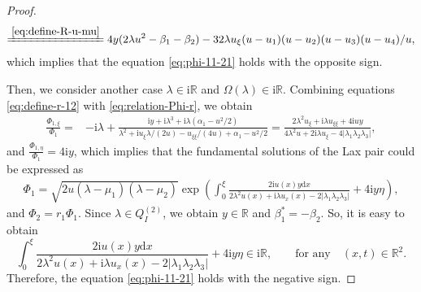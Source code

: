 \documentclass[11pt,reqno]{amsart}
\newcommand{\ii}{\mathrm{i}}
\newcommand{\dd}{\mathrm{d}}
\numberwithin{equation}{section}
\begin{document}
\begin{proof}
\begin{equation}
\begin{split}
			\xlongequal{\eqref{eq:define-R-u-mu}} 4y(2\lambda u^2-\beta_1-\beta_2)-32\lambda u_{\xi}(u-u_1)(u-u_2)(u-u_3)(u-u_4)/u,
		\end{split}
	\end{equation}
  which implies that the equation \eqref{eq:phi-11-21} holds with the opposite sign.
  
	
	Then, we consider another case $\lambda \in  \ii \mathbb{R}$ and $\Omega(\lambda)\in \ii \mathbb{R}$.
	Combining equations \eqref{eq:define-r-12} with \eqref{eq:relation-Phi-r}, we obtain 
	\begin{equation}\nonumber
		\begin{split}
			\frac{\Phi_{1,\xi}}{\Phi_{1}}
			=&-\ii \lambda+\frac{\ii y +\ii \lambda^3+\ii \lambda(\alpha_1-u^2/2)}{\lambda^2+\ii u_{\xi}\lambda/(2u)-u_{\xi\xi}/(4u)+\alpha_1-u^2/2} 
			=\frac{2\lambda^2 u_{\xi}+\ii \lambda u_{\xi\xi}+4\ii uy }{4\lambda^2u+2\ii\lambda u_{\xi}-4|\lambda_1\lambda_2\lambda_3|}, 
		\end{split}
	\end{equation}
	and $\frac{\Phi_{1,\eta}}{\Phi_{1}}=4\ii y$,	 which implies that the fundamental solutions of the Lax pair could be expressed as
	\begin{equation}\nonumber
		\begin{split}
			\Phi_{1}
			=\sqrt{2 u(\lambda-\mu_1)(\lambda-\mu_2)}\exp\left(\int_{0}^{\xi}\frac{2\ii u(x)y \dd x}{2\lambda^2u(x)+\ii\lambda u_x(x)-2|\lambda_1\lambda_2\lambda_3|}+4\ii y \eta\right), 
		\end{split}
	\end{equation}
	and $\Phi_{2}=r_1\Phi_{1}$.
	Since $\lambda\in  Q^{(2)} _I$, we obtain $y\in \mathbb{R}$ and $\beta_1^*=-\beta_2$.
	So, it is easy to obtain 
	\begin{equation}\nonumber
		\int_{0}^{\xi}\frac{2\ii u(x)y \dd x}{2\lambda^2u(x)+\ii\lambda u_x(x)-2|\lambda_1\lambda_2\lambda_3|}+4\ii y \eta\in \ii \mathbb{R}, \qquad \text{for any} \quad (x,t)\in \mathbb{R}^2. 
	\end{equation}
Therefore, the equation \eqref{eq:phi-11-21} holds with the negative sign.
\end{proof}
\end{document}
